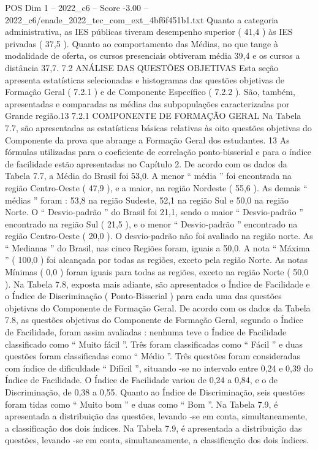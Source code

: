 \begin{textsample}{POS Dim 1 – 2022\_c6 – Score -3.00 – 2022\_c6/enade\_2022\_tec\_com\_ext\_4bf6f451b1.txt}
Quanto a categoria administrativa, as IES públicas tiveram desempenho superior ( 41,4 ) às IES privadas ( 37,5 ).
Quanto ao comportamento das Médias, no que tange à modalidade de oferta, os cursos presenciais obtiveram média 39,4 e os cursos a distância 37,7. 7.2 ANÁLISE DAS QUESTÕES OBJETIVAS Esta seção apresenta estatísticas selecionadas e histogramas das questões objetivas de Formação Geral ( 7.2.1 ) e de Componente Específico ( 7.2.2 ).
São, também, apresentadas e comparadas as médias das subpopulações caracterizadas por Grande região.13 7.2.1 COMPONENTE DE FORMAÇÃO GERAL Na Tabela 7.7, são apresentadas as estatísticas básicas relativas às oito questões objetivas do Componente da prova que abrange a Formação Geral dos estudantes. 13 As fórmulas utilizadas para o coeficiente de correlação ponto-bisserial e para o índice de facilidade estão apresentadas no Capítulo 2.
De acordo com os dados da Tabela 7.7, a Média do Brasil foi 53,0.
A menor “ média ” foi encontrada na região Centro-Oeste ( 47,9 ), e a maior, na região Nordeste ( 55,6 ).
As demais “ médias ” foram : 53,8 na região Sudeste, 52,1 na região Sul e 50,0 na região Norte.
O “ Desvio-padrão ” do Brasil foi 21,1, sendo o maior “ Desvio-padrão ” encontrado na região Sul ( 21,5 ), e o menor “ Desvio-padrão ” encontrado na região Centro-Oeste ( 20,0 ).
O desvio-padrão não foi avaliado na região norte.
As “ Medianas ” do Brasil, nas cinco Regiões foram, iguais a 50,0.
A nota “ Máxima ” ( 100,0 ) foi alcançada por todas as regiões, exceto pela região Norte.
As notas Mínimas ( 0,0 ) foram iguais para todas as regiões, exceto na região Norte ( 50,0 ).
Na Tabela 7.8, exposta mais adiante, são apresentados o Índice de Facilidade e o Índice de Discriminação ( Ponto-Bisserial ) para cada uma das questões objetivas do Componente de Formação Geral.
De acordo com os dados da Tabela 7.8, as questões objetivas do Componente de Formação Geral, segundo o Índice de Facilidade, foram assim avaliadas : nenhuma teve o Índice de Facilidade classificado como “ Muito fácil ”.
Três foram classificadas como “ Fácil ” e duas questões foram classificadas como “ Médio ”.
Três questões foram consideradas com índice de dificuldade “ Difícil ”, situando -se no intervalo entre 0,24 e 0,39 do Índice de Facilidade.
O Índice de Facilidade variou de 0,24 a 0,84, e o de Discriminação, de 0,38 a 0,55.
Quanto ao Índice de Discriminação, seis questões foram tidas como “ Muito bom ” e duas como “ Bom ”.
Na Tabela 7.9, é apresentada a distribuição das questões, levando -se em conta, simultaneamente, a classificação dos dois índices.
Na Tabela 7.9, é apresentada a distribuição das questões, levando -se em conta, simultaneamente, a classificação dos dois índices.

\end{textsample}
